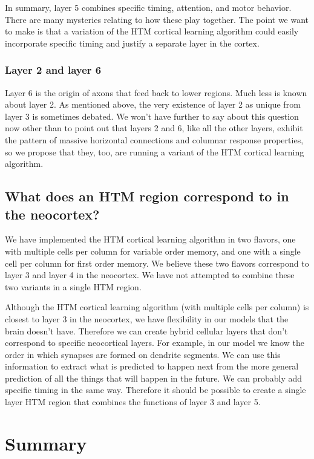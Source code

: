 \documentclass{report}
\begin{document}
In summary, layer 5 combines specific timing, attention, and motor
behavior. There are many mysteries relating to how these play
together. The point we want to make is that a variation of the HTM
cortical learning algorithm could easily incorporate specific timing
and justify a separate layer in the cortex.

\subsubsection*{Layer 2 and layer 6}
Layer 6 is the origin of axons that feed back to lower regions. Much
less is known about layer 2. As mentioned above, the very existence of
layer 2 as unique from layer 3 is sometimes debated. We won't have
further to say about this question now other than to point out that
layers 2 and 6, like all the other layers, exhibit the pattern of
massive horizontal connections and columnar response properties, so we
propose that they, too, are running a variant of the HTM cortical
learning algorithm.

\subsection*{What does an HTM region correspond to in the neocortex?}
We have implemented the HTM cortical learning algorithm in two
flavors, one with multiple cells per column for variable order memory,
and one with a single cell per column for first order memory. We
believe these two flavors correspond to layer 3 and layer 4 in the
neocortex. We have not attempted to combine these two variants in a
single HTM region.

Although the HTM cortical learning algorithm (with multiple cells per
column) is closest to layer 3 in the neocortex, we have flexibility in
our models that the brain doesn't have. Therefore we can create hybrid
cellular layers that don't correspond to specific neocortical
layers. For example, in our model we know the order in which synapses
are formed on dendrite segments. We can use this information to
extract what is predicted to happen next from the more general
prediction of all the things that will happen in the future. We can
probably add specific timing in the same way. Therefore it should be
possible to create a single layer HTM region that combines the
functions of layer 3 and layer 5.

\section*{Summary}
\end{document}
